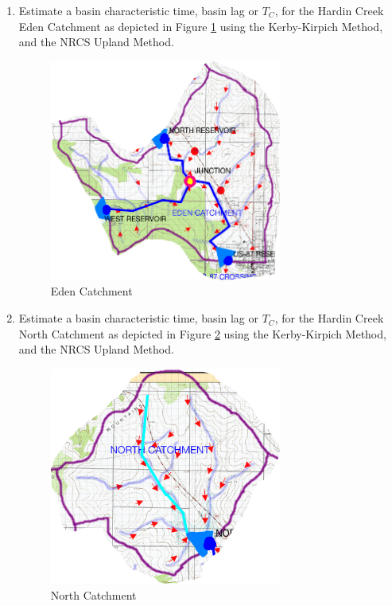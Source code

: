 \documentclass[12pt]{article}
\begin{document}
\begin{enumerate}

\item Estimate a basin characteristic time, basin lag or $T_C$, for the Hardin Creek Eden Catchment as depicted in Figure \ref{fig:EdenCatchment} using the Kerby-Kirpich Method, and the NRCS Upland Method.

\begin{figure}[h!] %
   \centering
   \includegraphics[width=3.0in]{EdenCatchment.png} 
   \caption{Eden Catchment}
   \label{fig:EdenCatchment}
\end{figure}

\item Estimate a basin characteristic time, basin lag or $T_C$, for the Hardin Creek North Catchment as depicted in Figure \ref{fig:NorthCatchment} using the Kerby-Kirpich Method, and the NRCS Upland Method.

\begin{figure}[h!] %
   \centering
   \includegraphics[width=3.0in]{NorthCatchment.png} 
   \caption{North Catchment}
   \label{fig:NorthCatchment}
\end{figure}
\clearpage


\end{enumerate}
\end{document}

